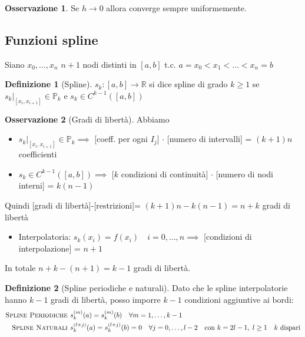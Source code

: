 \documentclass[a4paper,10pt]{article}
\theoremstyle{definition}
\theoremstyle{indentdefinition}
\newtheorem{defn}{Definizione}[section]
\theoremstyle{indenttheorem}
\theoremstyle{myremark}
\newtheorem*{rem*}{Osservazione}
\theoremstyle{indentgeneral}
\theoremstyle{plain}
\theoremstyle{plain}
\begin{document}
\begin{rem*}
    Se $h\to 0$ allora converge sempre uniformemente.
\end{rem*}

\subsection{Funzioni spline}
Siano $x_0,\dots,x_n$ $n+1$ nodi distinti in $[a,b]$ t.c. $\boxed{a=x_0}<x_1<\dots<\boxed{x_n=b}$
\begin{defn}[Spline]
$s_k\colon\left[a,b\right]\rightarrow\mathbb{R}$ si dice spline di
grado $k\geq1$ se $s_k\vert_{\left[x_{i},x_{i+1}\right]}\in \mathbb{P}_{k}$
e $s_k\in C^{k-1}\left(\left[a,b\right]\right)$
\end{defn}

\begin{rem*}[Gradi di libertà] Abbiamo
\begin{itemize}
    \item $s_k\vert_{\left[x_{i},x_{i+1}\right]}\in \mathbb{P}_{k}\implies$ [coeff. per ogni $I_j$] $\cdot$ [numero di intervalli] = $(k+1)n$ coefficienti 
    
\item $s_k\in C^{k-1}\left(\left[a,b\right]\right)\implies $ [$k$ condizioni di continuità]  $\cdot$ [numero di nodi interni] = $k(n-1)$
\end{itemize}
Quindi [gradi  di libertà]-[restrizioni]= $(k+1)n-k(n-1)=\boxed{n+k}$ gradi di libertà
\begin{itemize}
    \item Interpolatoria: $s_k(x_i)=f(x_i)\quad i=0,\dots, n \implies$ [condizioni di interpolazione] = $n+1$ 
\end{itemize}
In totale $n+k-(n+1)=\boxed{k-1}$ gradi di libertà.
\end{rem*}

\begin{defn}[Spline periodiche e naturali]  
Dato che le spline interpolatorie hanno $k-1$ gradi di libertà, posso
imporre $k-1$ condizioni aggiuntive ai bordi:
\begin{align*}
\textsc{Spline Periodiche } & s_k^{(m)}(a)=s_k^{(m)}(b)\quad \forall m=1,\dots,k-1\\
\textsc{Spline Naturali } & s_k^{(l+j)}(a)=s_k^{(l+j)}(b)=0\quad \forall j=0,\dots,l-2 \quad \text{con } k=2l-1,\;l\ge 1 \quad \text{$k$ dispari}
\end{align*}
\end{defn}
\end{document}
